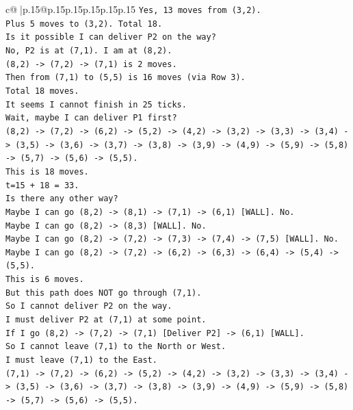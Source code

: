 \documentclass{article}
\begin{document}
{\begin{supertabular}{c@{$\;$}|p{.15\linewidth}@{}p{.15\linewidth}p{.15\linewidth}p{.15\linewidth}p{.15\linewidth}p{.15\linewidth}}
{{{\texttt{Yes, 13 moves from (3,2).} \\
\texttt{Plus 5 moves to (3,2). Total 18.} \\
\texttt{Is it possible I can deliver P2 on the way?} \\
\texttt{No, P2 is at (7,1). I am at (8,2).} \\
\texttt{(8,2) {-}> (7,2) {-}> (7,1) is 2 moves.} \\
\texttt{Then from (7,1) to (5,5) is 16 moves (via Row 3).} \\
\texttt{Total 18 moves.} \\
\texttt{It seems I cannot finish in 25 ticks.} \\
\texttt{Wait, maybe I can deliver P1 first?} \\
\texttt{(8,2) {-}> (7,2) {-}> (6,2) {-}> (5,2) {-}> (4,2) {-}> (3,2) {-}> (3,3) {-}> (3,4) {-}> (3,5) {-}> (3,6) {-}> (3,7) {-}> (3,8) {-}> (3,9) {-}> (4,9) {-}> (5,9) {-}> (5,8) {-}> (5,7) {-}> (5,6) {-}> (5,5).} \\
\texttt{This is 18 moves.} \\
\texttt{t=15 + 18 = 33.} \\
\texttt{Is there any other way?} \\
\texttt{Maybe I can go (8,2) {-}> (8,1) {-}> (7,1) {-}> (6,1) {[}WALL{]}. No.} \\
\texttt{Maybe I can go (8,2) {-}> (8,3) {[}WALL{]}. No.} \\
\texttt{Maybe I can go (8,2) {-}> (7,2) {-}> (7,3) {-}> (7,4) {-}> (7,5) {[}WALL{]}. No.} \\
\texttt{Maybe I can go (8,2) {-}> (7,2) {-}> (6,2) {-}> (6,3) {-}> (6,4) {-}> (5,4) {-}> (5,5).} \\
\texttt{This is 6 moves.} \\
\texttt{But this path does NOT go through (7,1).} \\
\texttt{So I cannot deliver P2 on the way.} \\
\texttt{I must deliver P2 at (7,1) at some point.} \\
\texttt{If I go (8,2) {-}> (7,2) {-}> (7,1) {[}Deliver P2{]} {-}> (6,1) {[}WALL{]}.} \\
\texttt{So I cannot leave (7,1) to the North or West.} \\
\texttt{I must leave (7,1) to the East.} \\
\texttt{(7,1) {-}> (7,2) {-}> (6,2) {-}> (5,2) {-}> (4,2) {-}> (3,2) {-}> (3,3) {-}> (3,4) {-}> (3,5) {-}> (3,6) {-}> (3,7) {-}> (3,8) {-}> (3,9) {-}> (4,9) {-}> (5,9) {-}> (5,8) {-}> (5,7) {-}> (5,6) {-}> (5,5).} \\
}}}
\end{supertabular}}
\end{document}
